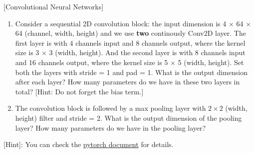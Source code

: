 \item {} [Convolutional Neural Networks]

\begin{enumerate}
    \item Consider a sequential 2D convolution block: the input dimension is 4 $\times$ 64 $\times$ 64 (channel, width, height) and we use \textbf{two} continously Conv2D layer. The first layer is with 4 channels input and 8 channels output, where the kernel size is 3 $\times$ 3 (width, height). And the second layer is with 8 channels input and 16 channels output, where the kernel size is 5 $\times$ 5 (width, height). Set both the layers with stride = 1 and pad = 1. What is the output dimension after each layer? How many parameters do we have in these two layers in total?  [Hint: Do not forget the bias term.]
    \item The convolution block is followed by a max pooling layer with $2\times 2$ (width, height) filter and stride
    = 2. What is the output dimension of the pooling layer? How many parameters do we have in the pooling
    layer? 
\end{enumerate}

[Hint]: You can check the \href{https://pytorch.org/docs/stable/nn.html#convolution-layers}{pytorch document} for details.

\solution









\newpage